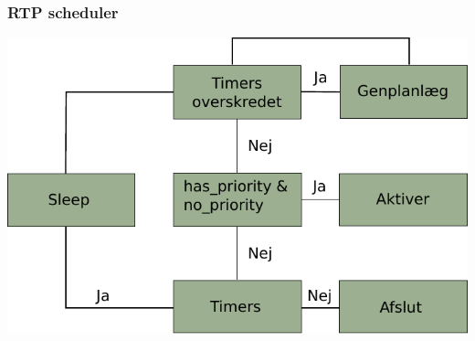 \documentclass[12pt]{beamer}
\begin{document}
\begin{frame}
  \frametitle{RTP scheduler}
\includegraphics[scale=0.9]{rtp-scheduler}
\end{frame}
\end{document}
